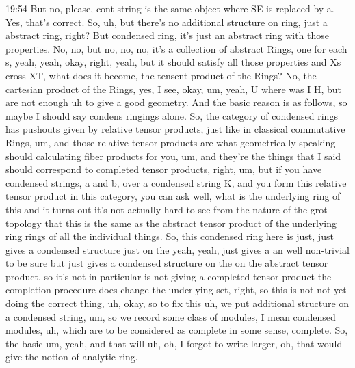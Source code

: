 \begin{unfinished}{19:54}
But no, please, cont string is the same object where SE is replaced by a. Yes, that's correct. So, uh, but there's no additional structure on ring, just a abstract ring, right? But condensed ring, it's just an abstract ring with those properties. No, no, but no, no, no, it's a collection of abstract Rings, one for each s, yeah, yeah, okay, right, yeah, but it should satisfy all those properties and Xs cross XT, what does it become, the tensent product of the Rings? No, the cartesian product of the Rings, yes, I see, okay, um, yeah, U where was I H, but are not enough uh to give a good geometry. And the basic reason is as follows, so maybe I should say condens ringings alone. So, the category of condensed rings has pushouts given by relative tensor products, just like in classical commutative Rings, um, and those relative tensor products are what geometrically speaking should calculating fiber products for you, um, and they're the things that I said should correspond to completed tensor products, right, um, but if you have condensed strings, a and b, over a condensed string K, and you form this relative tensor product in this category, you can ask well, what is the underlying ring of this and it turns out it's not actually hard to see from the nature of the grot topology that this is the same as the abstract tensor product of the underlying ring rings of all the individual things. So, this condensed ring here is just, just gives a condensed structure just on the yeah, yeah, just gives a an well non-trivial to be sure but just gives a condensed structure on the on the abstract tensor product, so it's not in particular is not giving a completed tensor product the completion procedure does change the underlying set, right, so this is not not yet doing the correct thing, uh, okay, so to fix this uh, we put additional structure on a condensed string, um, so we record some class of modules, I mean condensed modules, uh, which are to be considered as complete in some sense, complete. So, the basic um, yeah, and that will uh, oh, I forgot to write larger, oh, that would give the notion of analytic ring.


\end{unfinished}
